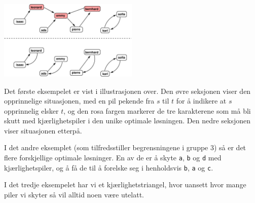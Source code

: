 \section*{\sampleexplanations}

\begin{center}
\includegraphics[width=0.5\textwidth]{polygonfig.pdf}
\end{center}

Det første eksempelet er vist i illustrasjonen over. Den øvre seksjonen viser den opprinnelige situasjonen, med en pil pekende fra $s$ til $t$ 
for å indikere at $s$ opprinnelig elsker $t$, og den rosa fargen markerer de tre karakterene som må bli skutt med
kjærlighetspiler i den unike optimale løsningen. Den nedre seksjonen viser situasjonen etterpå.


I det andre eksemplet (som tilfredsstiller begrensningene i gruppe 3) så er det flere forskjellige optimale løsninger.
En av de er å skyte \texttt{a}, \texttt{b} og \texttt{d} med kjærlighetspiler, og å få de til å forelske seg i henholdsvis \texttt{b}, \texttt{a} og \texttt{c}.

I det tredje eksempelet har vi et kjærlighetstriangel, hvor uansett hvor mange piler vi skyter så vil alltid noen være utelatt.
